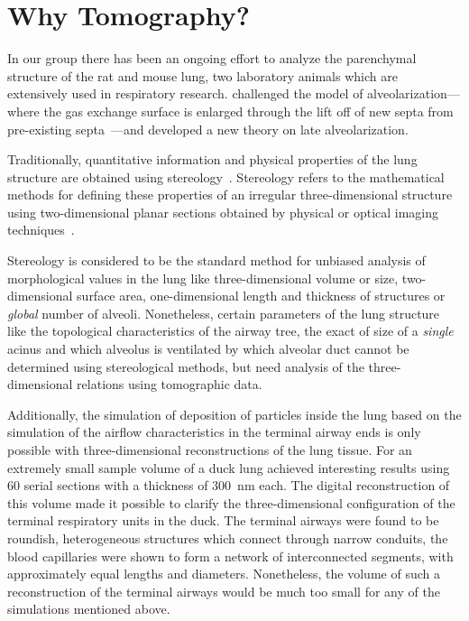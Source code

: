 \section{Why Tomography?}
In our group there has been an ongoing effort to analyze the parenchymal structure of the rat and mouse lung, two laboratory animals which are extensively used in respiratory research. \citet{Mund2008} challenged the model of alveolarization---where the gas exchange surface is enlarged through the lift off of new septa from pre-existing septa~\cite{Burri1974,Massaro1985}---and developed a new theory on late alveolarization.

Traditionally, quantitative information and physical properties of the lung structure are obtained using stereology~\cite{Ochs2006}. Stereology refers to the mathematical methods for defining these properties of an irregular three-dimensional structure using two-dimensional planar sections obtained by physical or optical imaging techniques~\cite{Hsia2010}.

Stereology is considered to be the standard method for unbiased analysis of morphological values in the lung like three-dimensional volume or size, two-dimensional surface area, one-dimensional length and thickness of structures or \emph{global} number of alveoli. Nonetheless, certain parameters of the lung structure like the topological characteristics of the airway tree, the exact of size of a \emph{single} acinus and which alveolus is ventilated by which alveolar duct cannot be determined using stereological methods, but need analysis of the three-dimensional relations using tomographic data.

Additionally, the simulation of deposition of particles inside the lung based on the simulation of the airflow characteristics in the terminal airway ends is only possible with three-dimensional reconstructions of the lung tissue. For an extremely small sample volume of a duck lung \citet{Woodward2005} achieved interesting results using 60 serial sections with a thickness of \SI{300}{\nano\meter} each. The digital reconstruction of this volume made it possible to clarify the three-dimensional configuration of the terminal respiratory units in the duck. The terminal airways were found to be roundish, heterogeneous structures which connect through narrow conduits, the blood capillaries were shown to form a network of interconnected segments, with approximately equal lengths and diameters. Nonetheless, the volume of such a reconstruction of the terminal airways would be much too small for any of the simulations mentioned above.


